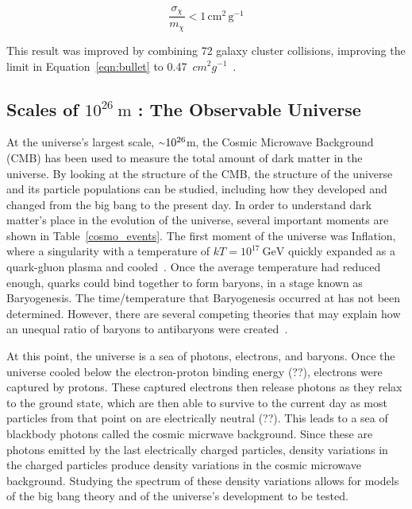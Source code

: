     \begin{equation}\label{eqn:bullet}
      \frac{\sigma_{\chi}}{m_{\chi}} < 1 \, \textrm{cm}^2 \, \textrm{g}^{-1}
    \end{equation}
    
    This result was improved by combining 72 galaxy cluster collisions, improving the limit in Equation~\ref{eqn:bullet} to \SI{0.47}{$cm^{2} g^{-1}$}~\cite{cluster_72}.


  \subsection{Scales of $10^{26}\:\text{m}$ : The Observable Universe}\label{dm_universe}
    At the universe's largest scale, $\nicetilde 10^{26}$m, the Cosmic Microwave Background (CMB) has been used to measure the total amount of dark matter in the universe.
    By looking at the structure of the CMB, the structure of the universe and its particle populations can be studied, including how they developed and changed from the big bang to the present day.
    In order to understand dark matter's place in the evolution of the universe, several important moments are shown in Table~\ref{cosmo_events}.
    The first moment of the universe was Inflation, where a singularity with a temperature of $kT=10^{17}\:\textrm{GeV}$ quickly expanded as a quark-gluon plasma and cooled~\cite{inflation0,inflation1,inflation2,inflation3}.
    Once the average temperature had reduced enough, quarks could bind together to form baryons, in a stage known as Baryogenesis.
    The time/temperature that Baryogenesis occurred at has not been determined.
    However, there are several competing theories that may explain how an unequal ratio of baryons to antibaryons were created~\cite{baryogenesis1,baryogenesis2}.
    
    At this point, the universe is a sea of photons, electrons, and baryons.
    Once the universe cooled below the electron-proton binding energy {\color{red}(??)}, electrons were captured by protons.
    These captured electrons then release photons as they relax to the ground state, which are then able to survive to the current day as most particles from that point on are electrically neutral {\color{red}(??)}.
    This leads to a sea of blackbody photons called the cosmic micrwave background.
    Since these are photons emitted by the last electrically charged particles, density variations in the charged particles produce density variations in the cosmic microwave background.
    Studying the spectrum of these density variations allows for models of the big bang theory and of the universe's development to be tested.
    
